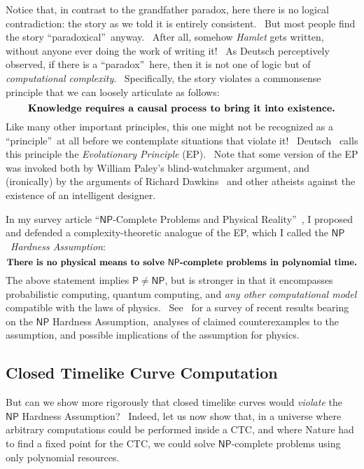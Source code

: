 \documentclass[11pt,onecolumn]{article}%
\begin{document}
Notice that, in contrast to the grandfather paradox, here there is no logical
contradiction: the story as we told it is entirely consistent. \ But most
people find the story \textquotedblleft paradoxical\textquotedblright\ anyway.
\ After all, somehow \textit{Hamlet} gets written, without anyone ever doing
the work of writing it! \ As Deutsch \cite{deutsch:ctc} perceptively observed,
if there is a \textquotedblleft paradox\textquotedblright\ here, then it is
not one of logic but of \textit{computational complexity}. \ Specifically, the
story violates a commonsense principle that we can loosely articulate as
follows:%
\[
\text{\textbf{Knowledge requires a causal process to bring it into
existence.}}%
\]
Like many other important principles, this one might not be recognized as a
\textquotedblleft principle\textquotedblright\ at all before we contemplate
situations that violate it! \ Deutsch \cite{deutsch:ctc}\ calls this principle
the \textit{Evolutionary Principle} (EP). \ Note that some version of the EP
was invoked both by William Paley's blind-watchmaker argument, and
(ironically) by the arguments of Richard Dawkins \cite{dawkins}\ and other
atheists against the existence of an intelligent designer.

In my survey article \textquotedblleft$\mathsf{NP}$-Complete Problems and
Physical Reality\textquotedblright\ \cite{aar:np}, I proposed and defended a
complexity-theoretic analogue of the EP, which I called the $\mathsf{NP}%
$\ \textit{Hardness Assumption}:%
\[
\text{\textbf{There is no physical means to solve }}\mathsf{NP}%
\text{\textbf{-complete problems in polynomial time.}}%
\]
The above statement implies $\mathsf{P}\neq\mathsf{NP}$, but is stronger in
that it encompasses probabilistic computing, quantum computing, and
\textit{any other} \textit{computational model} compatible with the laws of
physics. \ See \cite{aar:np}\ for a survey of recent results bearing on the
$\mathsf{NP}$ Hardness Assumption,\ analyses of claimed counterexamples to the
assumption, and possible implications of the assumption for physics.

\subsection{Closed Timelike Curve Computation\label{CTCCOMP}}

But can we show more rigorously that closed timelike curves would
\textit{violate} the $\mathsf{NP}$ Hardness Assumption? \ Indeed, let us now
show that, in a universe where arbitrary computations could be performed
inside a CTC, and where Nature had to find a fixed point for the CTC, we could
solve $\mathsf{NP}$-complete problems using only polynomial resources.
\end{document}
